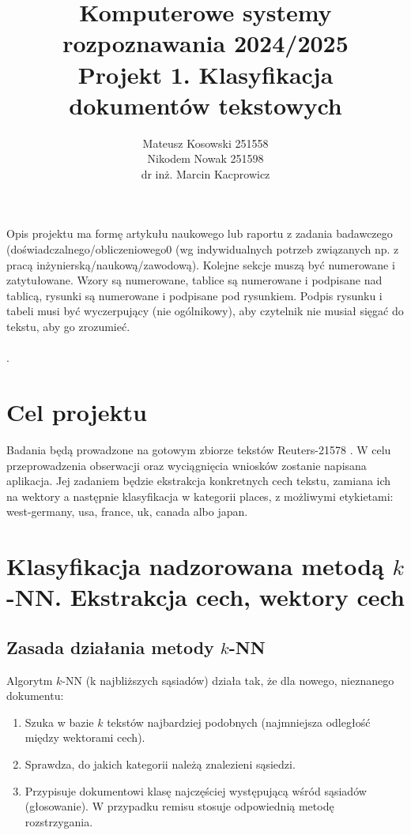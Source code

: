 \documentclass{article}
\author{
	Mateusz Kosowski 251558 \\
	Nikodem Nowak 251598\\
dr inż. Marcin Kacprowicz
}
\title{Komputerowe systemy rozpoznawania 2024/2025\\Projekt 1. Klasyfikacja dokumentów tekstowych}
\begin{document}
\maketitle

Opis projektu ma formę artykułu naukowego lub raportu z zadania
badawczego (doświadczalnego/obliczeniowego0 (wg indywidualnych potrzeb związanych np. z
pracą inżynierską/naukową/zawodową). Kolejne sekcje muszą być numerowane i
zatytułowane. Wzory są numerowane, tablice są numerowane i podpisane nad
tablicą, rysunki są numerowane i podpisane pod rysunkiem. Podpis rysunku i
tabeli musi być wyczerpujący (nie ogólnikowy), aby czytelnik nie musiał sięgać do tekstu, aby go
zrozumieć.\\
\\
.

\section{Cel projektu}
Badania będą prowadzone na gotowym zbiorze tekstów Reuters-21578 \cite{reuters}.
W celu przeprowadzenia obserwacji oraz wyciągnięcia wniosków zostanie napisana aplikacja.
Jej zadaniem będzie ekstrakcja konkretnych cech tekstu, zamiana ich na wektory a następnie klasyfikacja w kategorii places,
z możliwymi etykietami: west-germany, usa, france, uk, canada albo japan.


\section{Klasyfikacja nadzorowana metodą $k$-NN. Ekstrakcja cech, wektory cech}

\subsection{Zasada działania metody $k$-NN}
Algorytm $k$-NN (k najbliższych sąsiadów) \cite{knn} działa tak, że dla nowego, nieznanego dokumentu:
\begin{enumerate}
	\item Szuka w bazie $k$ tekstów najbardziej podobnych (najmniejsza odległość między wektorami cech).
	\item Sprawdza, do jakich kategorii należą znalezieni sąsiedzi.
	\item Przypisuje dokumentowi klasę najczęściej występującą wśród sąsiadów (głosowanie). W przypadku remisu stosuje odpowiednią metodę rozstrzygania.
\end{enumerate}
\end{document}
